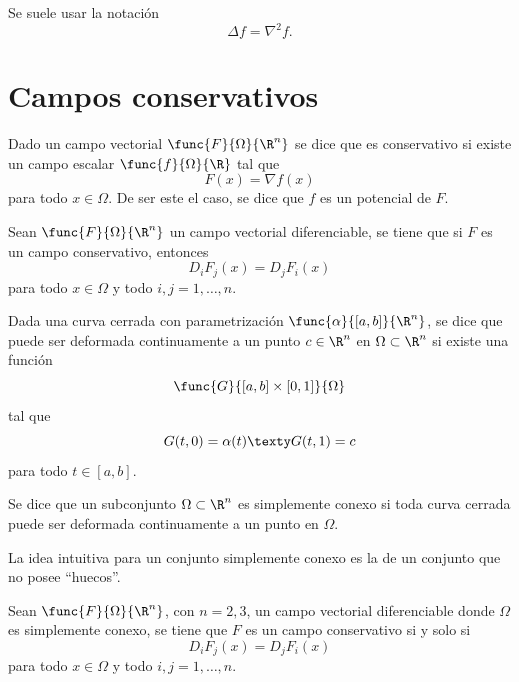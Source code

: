 \documentclass[a4,11pt]{aleph-notas}
\begin{document}
\begin{advertencia}
    Se suele usar la notación
    \[
        \Delta f = \nabla^2 f.
    \]
\end{advertencia}


\section{Campos conservativos}


\begin{defi}
    Dado un campo vectorial $\func{F}{\Omega}{\R^n}$ se dice que es conservativo si existe un campo escalar $\func{f}{\Omega}{\R}$ tal que 
    \[
        F(x)=\nabla f(x)
    \]
    para todo $x\in \Omega$. De ser este el caso, se dice que $f$ es un potencial de $F$.
\end{defi}

\begin{prop}
    Sean $\func{F}{\Omega}{\R^n}$ un campo vectorial diferenciable, se tiene que si $F$ es un campo conservativo, entonces
    \[
        D_i F_j(x) = D_j F_i(x)
    \]
    para todo $x\in \Omega$ y todo $i,j=1,\ldots,n$.
\end{prop}


\begin{defi}
    Dada una curva cerrada con parametrización $\func{\alpha}{[a,b]}{\R^n}$, se dice que puede ser deformada continuamente a un punto $c\in\R^n$ en $\Omega\subset \R^n$ si existe una función
    \[
        \func{G}{[a,b]\times[0,1]}{\Omega}
    \]
    tal que
    \[
        G(t,0)=\alpha(t)
        \texty
        G(t,1)=c
    \]
    para todo $t\in[a,b]$.
    
    Se dice que un subconjunto $\Omega\subset \R^n$ es simplemente conexo si toda curva cerrada puede ser deformada continuamente a un punto en $\Omega$.
\end{defi}

\begin{advertencia}
    La idea intuitiva para un conjunto simplemente conexo es la de un conjunto que no posee ``huecos''.
\end{advertencia}

\begin{prop}
    Sean $\func{F}{\Omega}{\R^n}$, con $n=2,3$, un campo vectorial diferenciable donde $\Omega$ es simplemente conexo, se tiene que $F$ es un campo conservativo si y solo si
    \[
        D_i F_j(x) = D_j F_i(x)
    \]
    para todo $x\in \Omega$ y todo $i,j=1,\ldots,n$.
\end{prop}
\end{document}

